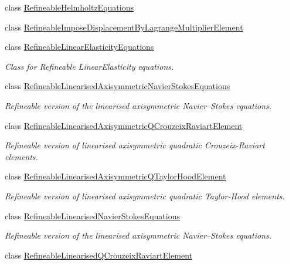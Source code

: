 \begin{DoxyCompactItemize}
class \hyperlink{classoomph_1_1RefineableHelmholtzEquations}{Refineable\+Helmholtz\+Equations}
\item 
class \hyperlink{classoomph_1_1RefineableImposeDisplacementByLagrangeMultiplierElement}{Refineable\+Impose\+Displacement\+By\+Lagrange\+Multiplier\+Element}
\item 
class \hyperlink{classoomph_1_1RefineableLinearElasticityEquations}{Refineable\+Linear\+Elasticity\+Equations}
\begin{DoxyCompactList}\small\item\em Class for Refineable Linear\+Elasticity equations. \end{DoxyCompactList}\item 
class \hyperlink{classoomph_1_1RefineableLinearisedAxisymmetricNavierStokesEquations}{Refineable\+Linearised\+Axisymmetric\+Navier\+Stokes\+Equations}
\begin{DoxyCompactList}\small\item\em Refineable version of the linearised axisymmetric Navier--Stokes equations. \end{DoxyCompactList}\item 
class \hyperlink{classoomph_1_1RefineableLinearisedAxisymmetricQCrouzeixRaviartElement}{Refineable\+Linearised\+Axisymmetric\+Q\+Crouzeix\+Raviart\+Element}
\begin{DoxyCompactList}\small\item\em Refineable version of linearised axisymmetric quadratic Crouzeix-\/\+Raviart elements. \end{DoxyCompactList}\item 
class \hyperlink{classoomph_1_1RefineableLinearisedAxisymmetricQTaylorHoodElement}{Refineable\+Linearised\+Axisymmetric\+Q\+Taylor\+Hood\+Element}
\begin{DoxyCompactList}\small\item\em Refineable version of linearised axisymmetric quadratic Taylor-\/\+Hood elements. \end{DoxyCompactList}\item 
class \hyperlink{classoomph_1_1RefineableLinearisedNavierStokesEquations}{Refineable\+Linearised\+Navier\+Stokes\+Equations}
\begin{DoxyCompactList}\small\item\em Refineable version of the linearised axisymmetric Navier--Stokes equations. \end{DoxyCompactList}\item 
class \hyperlink{classoomph_1_1RefineableLinearisedQCrouzeixRaviartElement}{Refineable\+Linearised\+Q\+Crouzeix\+Raviart\+Element}

\end{DoxyCompactItemize}
